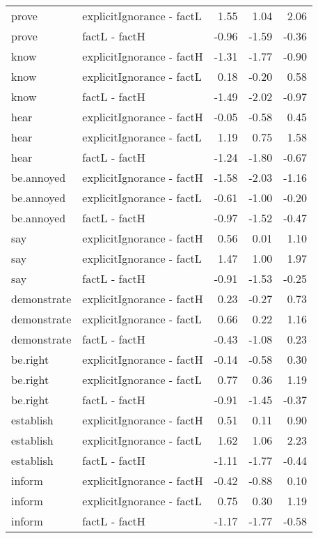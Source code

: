 \begin{longtable}{llrrr}
  prove & explicitIgnorance - factL & 1.55 & 1.04 & 2.06 \\ 
  prove & factL - factH & -0.96 & -1.59 & -0.36 \\ 
  know & explicitIgnorance - factH & -1.31 & -1.77 & -0.90 \\ 
  know & explicitIgnorance - factL & 0.18 & -0.20 & 0.58 \\ 
  know & factL - factH & -1.49 & -2.02 & -0.97 \\ 
  hear & explicitIgnorance - factH & -0.05 & -0.58 & 0.45 \\ 
  hear & explicitIgnorance - factL & 1.19 & 0.75 & 1.58 \\ 
  hear & factL - factH & -1.24 & -1.80 & -0.67 \\ 
  be.annoyed & explicitIgnorance - factH & -1.58 & -2.03 & -1.16 \\ 
  be.annoyed & explicitIgnorance - factL & -0.61 & -1.00 & -0.20 \\ 
  be.annoyed & factL - factH & -0.97 & -1.52 & -0.47 \\ 
  say & explicitIgnorance - factH & 0.56 & 0.01 & 1.10 \\ 
  say & explicitIgnorance - factL & 1.47 & 1.00 & 1.97 \\ 
  say & factL - factH & -0.91 & -1.53 & -0.25 \\ 
  demonstrate & explicitIgnorance - factH & 0.23 & -0.27 & 0.73 \\ 
  demonstrate & explicitIgnorance - factL & 0.66 & 0.22 & 1.16 \\ 
  demonstrate & factL - factH & -0.43 & -1.08 & 0.23 \\ 
  be.right & explicitIgnorance - factH & -0.14 & -0.58 & 0.30 \\ 
  be.right & explicitIgnorance - factL & 0.77 & 0.36 & 1.19 \\ 
  be.right & factL - factH & -0.91 & -1.45 & -0.37 \\ 
  establish & explicitIgnorance - factH & 0.51 & 0.11 & 0.90 \\ 
  establish & explicitIgnorance - factL & 1.62 & 1.06 & 2.23 \\ 
  establish & factL - factH & -1.11 & -1.77 & -0.44 \\ 
  inform & explicitIgnorance - factH & -0.42 & -0.88 & 0.10 \\ 
  inform & explicitIgnorance - factL & 0.75 & 0.30 & 1.19 \\ 
  inform & factL - factH & -1.17 & -1.77 & -0.58 \\ 

\end{longtable}

